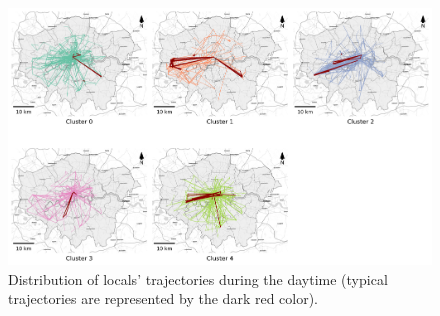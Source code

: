 \documentclass{article}
\theoremstyle{remark}
\begin{document}
\begin{figure}[!h]
\centering
\includegraphics[width=1\textwidth]{figures/traj_distribution_daytime_locals.png}
\caption{\label{fig:traj_distribution_daytime_locals}Distribution of locals' trajectories during the daytime (typical trajectories are represented by the dark red color).}
\end{figure}
\end{document}
